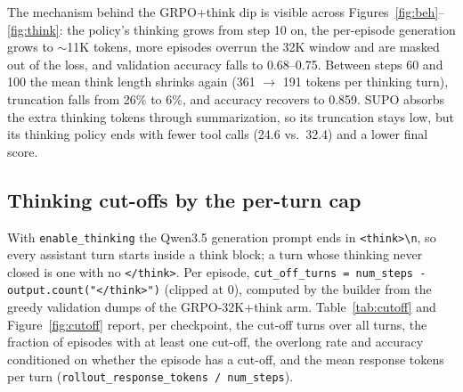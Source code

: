 \documentclass[11pt]{article}
\newcommand{\p}[1]{\texttt{#1}}
\begin{document}
The mechanism behind the GRPO+think dip is visible across Figures~\ref{fig:beh}--\ref{fig:think}: the policy's thinking grows from step 10 on, the per-episode generation grows to $\sim$11K tokens, more episodes overrun the 32K window and are masked out of the loss, and validation accuracy falls to 0.68--0.75. Between steps 60 and 100 the mean think length shrinks again (361 $\to$ 191 tokens per thinking turn), truncation falls from 26\% to 6\%, and accuracy recovers to 0.859. SUPO absorbs the extra thinking tokens through summarization, so its truncation stays low, but its thinking policy ends with fewer tool calls (24.6 vs.\ 32.4) and a lower final score.


\subsection{Thinking cut-offs by the per-turn cap}\label{sec:cutoff}
With \p{enable\_thinking} the Qwen3.5 generation prompt ends in \p{<think>\textbackslash n}, so every assistant turn starts inside a think block; a turn whose thinking never closed is one with no \p{</think>}. Per episode, \p{cut\_off\_turns = num\_steps - output.count("</think>")} (clipped at 0), computed by the builder from the greedy validation dumps of the GRPO-32K+think arm. Table~\ref{tab:cutoff} and Figure~\ref{fig:cutoff} report, per checkpoint, the cut-off turns over all turns, the fraction of episodes with at least one cut-off, the overlong rate and accuracy conditioned on whether the episode has a cut-off, and the mean response tokens per turn (\p{rollout\_response\_tokens / num\_steps}).
\end{document}
